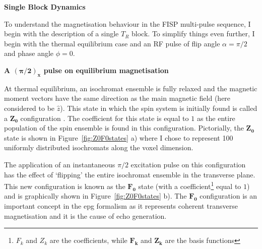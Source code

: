 \hfill

\large \textbf{Single Block Dynamics} \normalsize 

To understand the magnetisation behaviour in the FISP multi-pulse sequence, I begin with the description of a single $T_R$ block.
To simplify things even further, I begin with the thermal equilibrium case and an RF pulse of flip angle $\alpha = \pi/2$ and phase angle $\phi = 0$.

\hfill

\textbf{A $\bm{(\pi/2)_x}$ pulse on equilibrium magnetisation}

At thermal equilibrium, an isochromat ensemble is fully relaxed and the magnetic moment vectors have the same direction as the main magnetic field (here considered to be $\hat{z}$).
This state in which the spin system is initially found is called a $\bm{Z_0}$ configuration \cite{Weigel2015} \cite{Scheffler1999} \cite{Hennig1991}.
The coefficient for this state is equal to $1$ as the entire population of the spin ensemble is found in this configuration.
Pictorially, the $\bm{Z_0}$ state is shown in Figure~\ref{fig:Z0F0states} a) where I chose to represent 100 uniformly distributed isochromats along the voxel dimension.

\hfill

The application of an instantaneous $\pi/2$ excitation pulse on this configuration has the effect of `flipping' the entire isochromat ensemble in the transverse plane.
This new configuration is known as the $\bm{F_0}$ state \cite{Weigel2015} \cite{Scheffler1999} \cite{Hennig1991} (with a coefficient\footnote{$F_k$ and $Z_k$ are the coefficients, while $\bm{F_k}$ and $\bm{Z_k}$ are the basis functions} equal to $1$) and is graphically shown in Figure~\ref{fig:Z0F0states} b).
The $\bm{F_0}$ configuration is an important concept in the \ac{epg} formalism as it represents coherent transverse magnetisation and it is the cause of echo generation.

